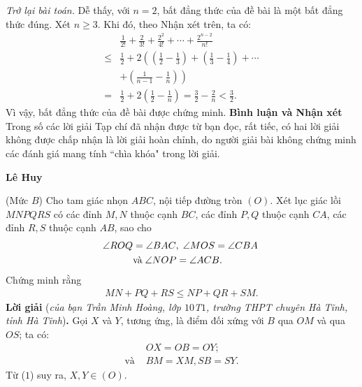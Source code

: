 \begin{multicols}{2}
	\vskip 0.05cm
	\textit{Trở lại bài toán.}
	\vskip 0.05cm
	Dễ thấy, với $n = 2$, bất đẳng thức của đề bài là một bất đẳng thức đúng.
	\vskip 0.05cm
	Xét $n \ge 3$. Khi đó, theo Nhận xét trên, ta có:
	\begin{align*}
		&\frac{1}{{2!}} + \frac{2}{{3!}} + \frac{{{2^2}}}{{4!}} +  \cdots  + \frac{{{2^{n - 2}}}}{{n!}} \\
		\le &\frac{1}{2} + 2\left( \left( {\frac{1}{2} - \frac{1}{3}} \right) + \left( {\frac{1}{3} - \frac{1}{4}} \right) +  \cdots \right. \\
		&\left.+ \left( {\frac{1}{{n - 1}} - \frac{1}{n}} \right) \right)\\
		= &\frac{1}{2} + 2\left( {\frac{1}{2} - \frac{1}{n}} \right) = \frac{3}{2} - \frac{2}{n} < \frac{3}{2}.
	\end{align*}
	Vì vậy, bất đẳng thức của đề bài được chứng minh.
	\vskip 0.05cm
	\textbf{\color{thachthuctoanhoc}Bình luận và Nhận xét}
	\vskip 0.05cm
	Trong số các lời giải Tạp chí đã nhận được từ bạn đọc, rất tiếc, có hai lời giải không được chấp nhận là lời giải hoàn chỉnh, do người giải bài không chứng minh các đánh giá mang tính ``chìa khóa" trong lời giải.
	\begin{flushright}
		\textbf{\color{thachthuctoanhoc}Lê Huy}
	\end{flushright}
	{}
	(Mức $B$) Cho tam giác nhọn $ABC$, nội tiếp đường tròn $(O)$. Xét lục giác lồi $MNPQRS$ có các đỉnh $M, N$ thuộc cạnh $BC$, các đỉnh $P, Q$ thuộc cạnh $CA$, các đỉnh $R, S$ thuộc cạnh $AB$, sao cho
	\begin{align*}
		\angle{ROQ} &=\angle{BAC},\; \angle{MOS} =\angle{CBA}\;\\
		&\text{\color{black}và}\;\angle{NOP }= \angle{ACB}.
	\end{align*}
	Chứng minh rằng 
	\begin{align*}
		MN + PQ + RS \leq NP + QR + SM.
	\end{align*}
	\textbf{\color{thachthuctoanhoc}Lời giải} (\textit{của bạn Trần Minh Hoàng, lớp $10$T$1$, trường THPT chuyên Hà Tĩnh, tỉnh Hà Tĩnh})\textbf{\color{thachthuctoanhoc}.}
	\vskip 0.05cm
	Gọi $X$ và $Y$, tương ứng, là điểm đối xứng với $B$ qua $OM$ và qua $OS$; ta có:
	\begin{align*}
		&OX = OB = OY; \tag{$1$}\\
		\text{và } &BM = XM, SB = SY. \tag{$2$}
	\end{align*}
	Từ ($1$) suy ra, $X, Y \in (O)$.
	\vskip 0.05cm
	\begin{figure}[H]

\end{figure}
\end{multicols}
